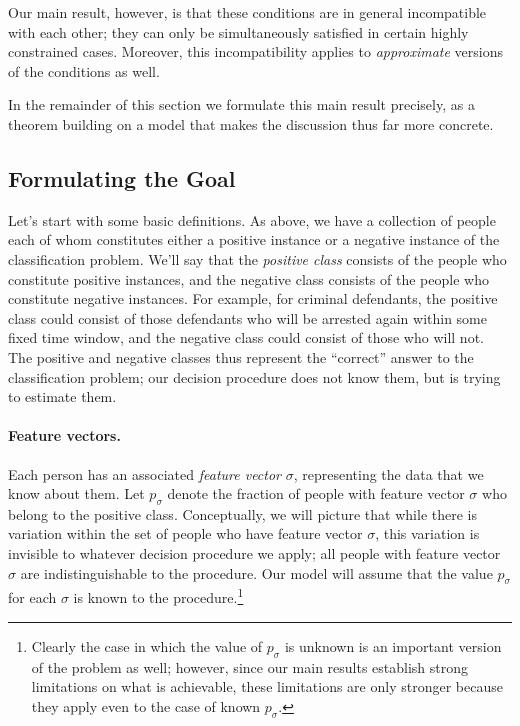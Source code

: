 \documentclass[11pt]{article}
\newcommand{\xhdr}[1]{\vspace{-0.2in} \paragraph*{\bf {#1}.}}
\begin{document}
Our main result, however, is that these conditions are in general
incompatible with each other; they can only be simultaneously satisfied
in certain highly constrained cases.
Moreover, this incompatibility applies to {\em approximate} versions
of the conditions as well.

In the remainder of this section
we formulate this main result precisely, as a theorem 
building on a model that makes the discussion thus far more concrete. 

\subsection{Formulating the Goal}

Let's start with some basic definitions.
As above, we have a collection of people
each of whom constitutes either a
positive instance or a negative instance of the classification problem.
We'll say that the {\em positive class} consists of the people
who constitute positive instances, and the negative class consists of
the people who constitute negative instances.
For example, for criminal defendants, the positive class could consist
of those defendants who will be arrested again
within some fixed time window,
and the negative class could consist of those who will not.
The positive and negative classes thus represent the ``correct''
answer to the classification problem; our decision procedure does not
know them, but is trying to estimate them.

\xhdr{Feature vectors}
Each person has an associated {\em feature vector} $\sigma$, representing
the data that we know about them.  Let $p_\sigma$ denote the fraction
of people with feature vector $\sigma$ who belong to the positive class.
Conceptually, we will picture that while there is variation within
the set of people who have feature vector $\sigma$, this variation
is invisible to whatever decision procedure we apply;
all people with feature vector $\sigma$ are indistinguishable to the procedure.
Our model will assume that
the value $p_\sigma$ for each $\sigma$ is known to the 
procedure.\footnote{Clearly the case in which the value of $p_\sigma$ is unknown
is an important version of the problem as well; however, since our main results
establish strong limitations on what is achievable, these limitations
are only stronger because they apply even to the case of known $p_\sigma$.}
\end{document}
